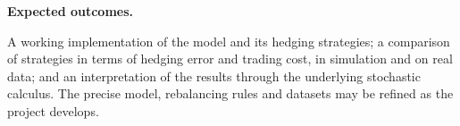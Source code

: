 \documentclass[10pt,leqno]{amsart}
\begin{document}
\medskip

\noindent\textbf{Expected outcomes.}\par
\noindent A working implementation of the model and its hedging strategies; a comparison of strategies in terms of hedging error and trading cost, in simulation and on real data; and an interpretation of the results through the underlying stochastic calculus. The precise model, rebalancing rules and datasets may be refined as the project develops.

\medskip

\ifdefined\PublicBuild

\else
{}
\fi
\end{document}

